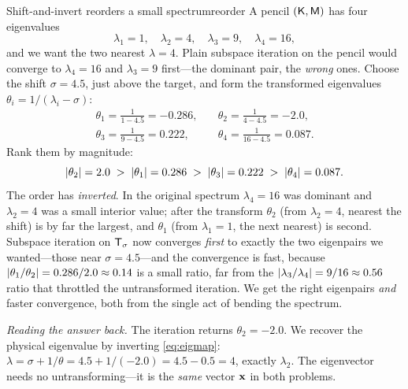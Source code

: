 \begin{workedexample}{Shift-and-invert reorders a small spectrum}{reorder}
A pencil $(\mathsf{K},\mathsf{M})$ has four eigenvalues
\[
  \lambda_1 = 1,\quad \lambda_2 = 4,\quad \lambda_3 = 9,\quad \lambda_4 = 16,
\]
and we want the two nearest $\lambda=4$. Plain subspace iteration on the pencil
would converge to $\lambda_4=16$ and $\lambda_3=9$ first---the dominant pair, the
\emph{wrong} ones. Choose the shift $\sigma=4.5$, just above the target, and form
the transformed eigenvalues $\theta_i=1/(\lambda_i-\sigma)$:
\[
  \begin{aligned}
  \theta_1 = \frac{1}{1-4.5} = -0.286,\quad
  &\theta_2 = \frac{1}{4-4.5} = -2.0,\\
  \theta_3 = \frac{1}{9-4.5} = 0.222,\quad
  &\theta_4 = \frac{1}{16-4.5} = 0.087.
  \end{aligned}
\]
Rank them by magnitude:
\[
  \lvert\theta_2\rvert=2.0 \;>\; \lvert\theta_1\rvert=0.286 \;>\; \lvert\theta_3\rvert=0.222
  \;>\; \lvert\theta_4\rvert=0.087.
\]
The order has \emph{inverted}. In the original spectrum $\lambda_4=16$ was
dominant and $\lambda_2=4$ was a small interior value; after the transform
$\theta_2$ (from $\lambda_2=4$, nearest the shift) is by far the largest, and
$\theta_1$ (from $\lambda_1=1$, the next nearest) is second. Subspace iteration on
$\mathsf{T}_\sigma$ now converges \emph{first} to exactly the two eigenpairs we
wanted---those near $\sigma=4.5$---and the convergence is fast, because
$\lvert\theta_1/\theta_2\rvert=0.286/2.0\approx 0.14$ is a small ratio, far from the
$\lvert\lambda_3/\lambda_4\rvert=9/16\approx 0.56$ ratio that throttled the untransformed
iteration. We get the right eigenpairs \emph{and} faster convergence, both from
the single act of bending the spectrum.

\medskip
\emph{Reading the answer back.} The iteration returns $\theta_2=-2.0$. We recover
the physical eigenvalue by inverting \cref{eq:eigmap}:
$\lambda = \sigma + 1/\theta = 4.5 + 1/(-2.0) = 4.5 - 0.5 = 4$, exactly
$\lambda_2$. The eigenvector needs no untransforming---it is the \emph{same}
vector $\mathbf{x}$ in both problems.
\end{workedexample}

